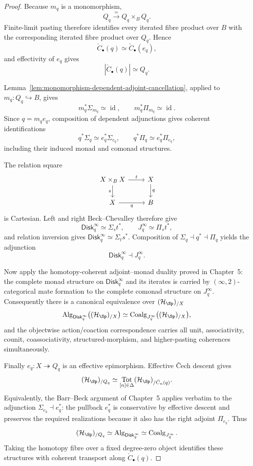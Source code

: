 \begin{proof}
Because $m_q$ is a monomorphism,
\[
    Q_q\xrightarrow{\simeq}Q_q\times_BQ_q.
\]
Finite-limit pasting therefore identifies every iterated fibre product over
$B$ with the corresponding iterated fibre product over $Q_q$.  Hence
\[
    \check C_\bullet(q)\simeq\check C_\bullet(e_q),
\]
and effectivity of $e_q$ gives
\[
    \left|\check C_\bullet(q)\right|\simeq Q_q.
\]

Lemma~\ref{lem:monomorphism-dependent-adjoint-cancellation}, applied to
$m_q:Q_q\hookrightarrow B$, gives
\[
    m_q^*\Sigma_{m_q}\simeq\operatorname{id},
    \qquad
    m_q^*\Pi_{m_q}\simeq\operatorname{id}.
\]
Since $q=m_qe_q$, composition of dependent adjunctions gives coherent
identifications
\[
    q^*\Sigma_q\simeq e_q^*\Sigma_{e_q},
    \qquad
    q^*\Pi_q\simeq e_q^*\Pi_{e_q},
\]
including their induced monad and comonad structures.

The relation square
\[
\begin{tikzcd}
X\times_BX \arrow[r,"t"] \arrow[d,"s"'] & X \arrow[d,"q"]\\
X \arrow[r,"q"'] & B
\end{tikzcd}
\]
is Cartesian.  Left and right Beck--Chevalley therefore give
\[
    \mathsf{Disk}^{\infty}_q\simeq\Sigma_s t^*,
    \qquad
    J^\infty_q\simeq\Pi_s t^*,
\]
and relation inversion gives
$\mathsf{Disk}^{\infty}_q\simeq\Sigma_t s^*$.
Composition of
$\Sigma_q\dashv q^*\dashv\Pi_q$ yields the adjunction
\[
    \mathsf{Disk}^{\infty}_q\dashv J^\infty_q.
\]

Now apply the homotopy-coherent adjoint--monad duality proved in Chapter~5:
the complete monad structure on $\mathsf{Disk}^{\infty}_q$ and its iterates is
carried by $(\infty,2)$-categorical mate formation to the complete comonad
structure on $J^\infty_q$.  Consequently there is a canonical equivalence over
$(\mathcal H_{\Sp})_{/X}$
\[
    \operatorname{Alg}_{\mathsf{Disk}^{\infty}_q}
    \bigl((\mathcal H_{\Sp})_{/X}\bigr)
    \simeq
    \operatorname{Coalg}_{J^\infty_q}
    \bigl((\mathcal H_{\Sp})_{/X}\bigr),
\]
and the objectwise action/coaction correspondence carries all unit,
associativity, counit, coassociativity, structured-morphism, and higher-pasting
coherences simultaneously.

Finally $e_q:X\twoheadrightarrow Q_q$ is an effective epimorphism.  Effective
\v{C}ech descent gives
\[
    (\mathcal H_{\Sp})_{/Q_q}
    \simeq
    \operatorname*{Tot}_{[n]\in\Delta}
    (\mathcal H_{\Sp})_{/\check C_n(q)}.
\]
Equivalently, the Barr--Beck argument of Chapter~5 applies verbatim to the
adjunction
$\Sigma_{e_q}\dashv e_q^*$: the pullback $e_q^*$ is conservative by
effective descent and preserves the required realizations because it also has
the right adjoint $\Pi_{e_q}$.  Thus
\[
    (\mathcal H_{\Sp})_{/Q_q}
    \simeq
    \operatorname{Alg}_{\mathsf{Disk}^{\infty}_q}
    \simeq
    \operatorname{Coalg}_{J^\infty_q}.
\]
Taking the homotopy fibre over a fixed degree-zero object identifies these
structures with coherent transport along $\check C_\bullet(q)$.


\end{proof}
